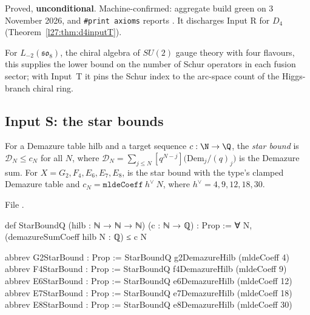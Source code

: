 \begin{status}
Proved, \textbf{unconditional}. Machine-confirmed: aggregate build green on 3 November 2026, and \texttt{\#print axioms} reports
. It discharges Input R for $D_4$ (Theorem~\ref{l27:thm:d4inputT}).
\end{status}

\begin{physics}
For $L_{-2}(\mathfrak{so}_8)$, the chiral algebra of $SU(2)$ gauge theory with four flavours, this supplies the lower
bound on the number of Schur operators in each fusion sector; with Input~T it pins the Schur index to the arc-space
count of the Higgs-branch chiral ring.
\end{physics}

\subsection{Input S: the star bounds}\label{l27:sec:starinput}

\begin{definition}[Input S]\label{l27:def:star}
For a Demazure table $\mathrm{hilb}$ and a target sequence $c:\N\to\Q$, the \emph{star bound} is $\mathcal D_N\le c_N$ for all
$N$, where $\mathcal D_N=\sum_{j\le N}[q^{N-j}]\bigl(\mathrm{Dem}_j/(q)_j\bigr)$ is the Demazure sum. For $X=G_2,F_4,E_6,E_7,E_8$,
 is the star bound with the type's clamped Demazure table and $c_N=\mathtt{mldeCoeff}\ h^\vee\ N$, where
$h^\vee=4,9,12,18,30$.
\end{definition}
\noindent File .
\begin{leancode}
def StarBoundQ (hilb : ℕ → ℕ → ℕ) (c : ℕ → ℚ) : Prop :=
  ∀ N, (demazureSumCoeff hilb N : ℚ) ≤ c N
\end{leancode}
\begin{leancode}
abbrev G2StarBound : Prop := StarBoundQ g2DemazureHilb (mldeCoeff 4)
abbrev F4StarBound : Prop := StarBoundQ f4DemazureHilb (mldeCoeff 9)
abbrev E6StarBound : Prop := StarBoundQ e6DemazureHilb (mldeCoeff 12)
abbrev E7StarBound : Prop := StarBoundQ e7DemazureHilb (mldeCoeff 18)
abbrev E8StarBound : Prop := StarBoundQ e8DemazureHilb (mldeCoeff 30)
\end{leancode}


